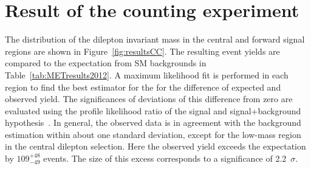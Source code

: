 \section{Result of the counting experiment}
The distribution of the dilepton invariant mass in the central and forward signal regions are shown in Figure~\ref{fig:resultsCC}. The resulting event yields are compared to the expectation from SM backgrounds in Table~\ref{tab:METresults2012}. A maximum likelihood fit is performed in each region to find the best estimator for the for the difference of expected and observed yield. The significances of deviations of this difference from zero are evaluated using the profile likelihood ratio of the signal and signal+background hypothesis~\cite{HiggsTool1}. In general, the observed data is in agreement with the background estimation within about one standard deviation, except for the low-mass region in the central dilepton selection. Here the observed yield exceeds the expectation by $109^{+48}_{-49}$ events. The size of this excess corresponds to a significance of 2.2~$\sigma$.  
